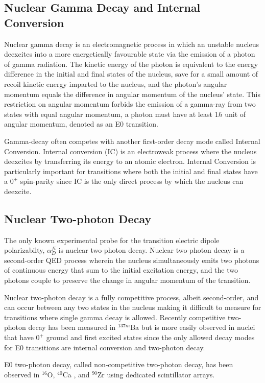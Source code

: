 \documentclass[cnatzke_thesis_proposal.tex]{subfiles}
\begin{document}
\subsection{Nuclear Gamma Decay and Internal Conversion}
Nuclear gamma decay is an electromagnetic process in which an unstable nucleus deexcites into a more energetically favourable state via the emission of a photon of gamma radiation. The kinetic energy of the photon is equivalent to the energy difference in the initial and final states of the nucleus, save for a small amount of recoil kinetic energy imparted to the nucleus, and the photon's angular momentum equals the difference in angular momentum of the nucleus' state. This restriction on angular momentum forbids the emission of a gamma-ray from two states with equal angular momentum, a photon must have at least 1$\hbar$ unit of angular momentum, denoted as an E0 transition.

Gamma-decay often competes with another first-order decay mode called Internal Conversion. Internal conversion (IC) is an electroweak process where the nucleus deexcites by transferring its energy to an atomic electron. Internal Conversion is particularly important for transitions where both the initial and final states have a $0^+$ spin-parity since IC is the only direct process by which the nucleus can deexcite. \cite{Krane1988} 

\subsection{Nuclear Two-photon Decay}

The only known experimental probe for the transition electric dipole polarizabilty, $\alpha_D^{fi}$ is nuclear two-photon decay.
Nuclear two-photon decay is a second-order QED process wherein the nucleus simultaneously emits two photons of continuous energy that sum to the initial excitation energy, and the two photons couple to preserve the change in angular momentum of the transition. \cite{Kramp1987} 

Nuclear two-photon decay is a fully competitive process, albeit second-order, and can occur between any two states in the nucleus making it difficult to measure for transitions where single gamma decay is allowed. Recently competitive two-photon decay has been measured in $^{137m}$Ba \cite{soderstrom_electromagnetic_2020} but is more easily observed in nuclei that have $0^+$ ground and first excited states since the only allowed decay modes for E0 transitions are internal conversion and two-photon decay. 

E0 two-photon decay, called non-competitive two-photon decay, has been observed in $^{16}$O, $^{40}$Ca \cite{schirmer_double_1984}, and $^{90}$Zr \cite{schirmer_double_1984} using dedicated scintillator arrays.   


\end{document}
